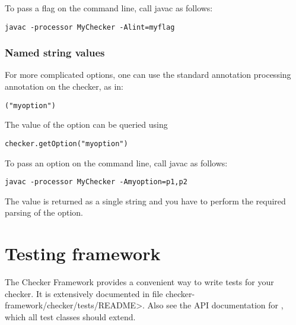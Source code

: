 To pass a flag on the command line, call javac as follows:

\begin{Verbatim}
javac -processor MyChecker -Alint=myflag
\end{Verbatim}


\subsubsection{Named string values\label{providing-command-line-options-named-string-values}}

For more complicated options, one can use the standard annotation
processing  annotation on the checker, as in:

\begin{alltt}
({"myoption"})
\end{alltt}

The value of the option can be queried using

\begin{Verbatim}
checker.getOption("myoption")
\end{Verbatim}

To pass an option on the command line, call javac as follows:

\begin{Verbatim}
javac -processor MyChecker -Amyoption=p1,p2
\end{Verbatim}

The value is returned as a single string and you have to perform the
required parsing of the option.





\section{Testing framework\label{testing-framework}}

\begin{sloppypar}
The Checker Framework provides a convenient way to write tests for your
checker.
It is extensively documented in file \<checker-framework/checker/tests/README>.
Also see the API documentation for
,
which all test classes should extend.
\end{sloppypar}


